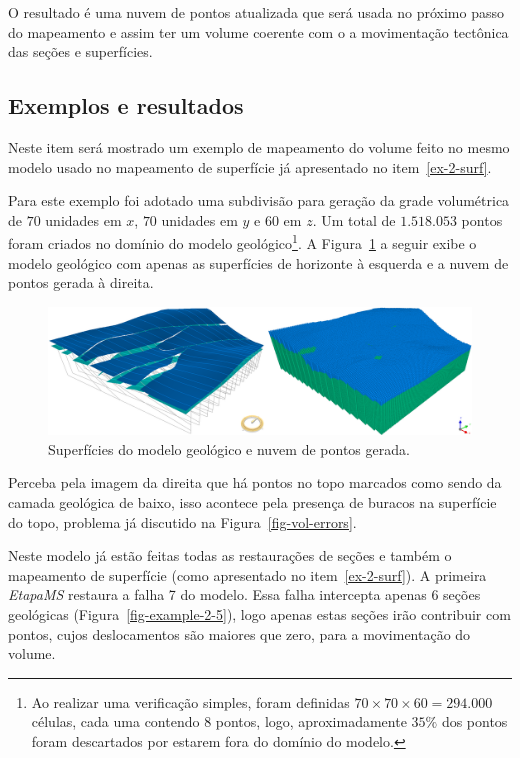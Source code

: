 O resultado é uma nuvem de pontos atualizada que será usada no próximo passo do mapeamento e assim ter um volume coerente com o a movimentação tectônica das seções e superfícies.

\subsection{Exemplos e resultados}

Neste item será mostrado um exemplo de mapeamento do volume feito no mesmo modelo usado no mapeamento de superfície já apresentado no item~\ref{ex-2-surf}.

Para este exemplo foi adotado uma subdivisão para geração da grade volumétrica de $70$ unidades em $x$, $70$ unidades em $y$ e $60$ em $z$. Um total de $1.518.053$ pontos foram criados no domínio do modelo geológico\footnote{Ao realizar uma verificação simples, foram definidas $70\times70\times60=294.000$ células, cada uma contendo $8$ pontos, logo, aproximadamente $35\%$ dos pontos foram descartados por estarem fora do domínio do modelo.}. A Figura~\ref{fig-vol-ex-1} a seguir exibe o modelo geológico com apenas as superfícies de horizonte à esquerda e a nuvem de pontos gerada à direita.

\begin{figure} [H]
  \begin{center}
    \includegraphics[width=\textwidth]{images/fig-vol-ex-1}
    \caption{Superfícies do modelo geológico e nuvem de pontos gerada.}\label{fig-vol-ex-1}
  \end{center}
\end{figure}

Perceba pela imagem da direita que há pontos no topo marcados como sendo da camada geológica de baixo, isso acontece pela presença de buracos na superfície do topo, problema já discutido na Figura~\ref{fig-vol-errors}.

Neste modelo já estão feitas todas as restaurações de seções e também o mapeamento de superfície (como apresentado no item~\ref{ex-2-surf}). A primeira \emph{EtapaMS} restaura a falha 7 do modelo. Essa falha intercepta apenas 6 seções geológicas (Figura~\ref{fig-example-2-5}), logo apenas estas seções irão contribuir com pontos, cujos deslocamentos são maiores que zero, para a movimentação do volume. 

